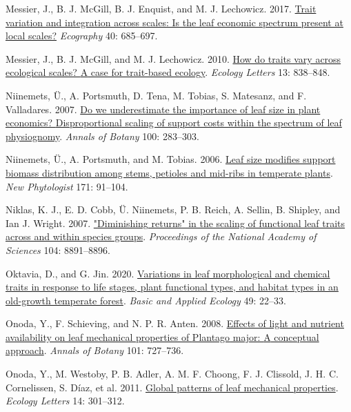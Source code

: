 \documentclass[
  12pt,
  a4paper,
,tablecaptionabove
]{scrartcl}
\newlength{\cslhangindent}
\newenvironment{CSLReferences}[2] %
 {%
  \setlength{\parindent}{0pt}
  \ifodd #1 \everypar{\setlength{\hangindent}{\cslhangindent}}\ignorespaces\fi
  \ifnum #2 > 0
  \setlength{\parskip}{#2\baselineskip}
  \fi
 }%
 {}
\begin{document}
\begin{CSLReferences}{1}{0}
\leavevmode{}%
Messier, J., B. J. McGill, B. J. Enquist, and M. J. Lechowicz. 2017. \href{https://doi.org/10.1111/ecog.02006}{Trait variation and integration across scales: Is the leaf economic spectrum present at local scales?} \emph{Ecography} 40: 685--697.

\leavevmode{}%
Messier, J., B. J. McGill, and M. J. Lechowicz. 2010. \href{https://doi.org/10.1111/j.1461-0248.2010.01476.x}{How do traits vary across ecological scales? {A} case for trait-based ecology}. \emph{Ecology Letters} 13: 838--848.

\leavevmode{}%
Niinemets, Ü., A. Portsmuth, D. Tena, M. Tobias, S. Matesanz, and F. Valladares. 2007. \href{https://doi.org/10.1093/aob/mcm107}{Do we underestimate the importance of leaf size in plant economics? {Disproportional} scaling of support costs within the spectrum of leaf physiognomy}. \emph{Annals of Botany} 100: 283--303.

\leavevmode{}%
Niinemets, Ü., A. Portsmuth, and M. Tobias. 2006. \href{https://doi.org/10.1111/j.1469-8137.2006.01741.x}{Leaf size modifies support biomass distribution among stems, petioles and mid-ribs in temperate plants}. \emph{New Phytologist} 171: 91--104.

\leavevmode{}%
Niklas, K. J., E. D. Cobb, Ü. Niinemets, P. B. Reich, A. Sellin, B. Shipley, and Ian J. Wright. 2007. \href{https://doi.org/10.1073/pnas.0701135104}{"{Diminishing} returns" in the scaling of functional leaf traits across and within species groups}. \emph{Proceedings of the National Academy of Sciences} 104: 8891--8896.

\leavevmode{}%
Oktavia, D., and G. Jin. 2020. \href{https://doi.org/10.1016/j.baae.2020.09.010}{Variations in leaf morphological and chemical traits in response to life stages, plant functional types, and habitat types in an old-growth temperate forest}. \emph{Basic and Applied Ecology} 49: 22--33.

\leavevmode{}%
Onoda, Y., F. Schieving, and N. P. R. Anten. 2008. \href{https://doi.org/10.1093/aob/mcn013}{Effects of light and nutrient availability on leaf mechanical properties of {Plantago} major: {A} conceptual approach}. \emph{Annals of Botany} 101: 727--736.

\leavevmode{}%
Onoda, Y., M. Westoby, P. B. Adler, A. M. F. Choong, F. J. Clissold, J. H. C. Cornelissen, S. Díaz, et al. 2011. \href{https://doi.org/10.1111/j.1461-0248.2010.01582.x}{Global patterns of leaf mechanical properties}. \emph{Ecology Letters} 14: 301--312.


\end{CSLReferences}
\end{document}
